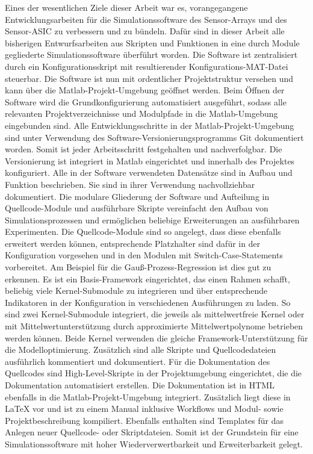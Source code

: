 Eines der wesentlichen Ziele dieser Arbeit war es, vorangegangene Entwicklungsarbeiten für die Simulationssoftware des Sensor-Arrays und des Sensor-ASIC zu verbessern und zu bündeln. Dafür sind in dieser Arbeit alle bisherigen Entwurfsarbeiten aus Skripten und Funktionen in eine durch Module gegliederte Simulationssoftware überführt worden. Die Software ist zentralisiert durch ein Konfigurationsskript mit resultierender Konfigurations-MAT-Datei steuerbar. Die Software ist nun mit ordentlicher Projektstruktur versehen und kann über die Matlab-Projekt-Umgebung geöffnet werden. Beim Öffnen der Software wird die Grundkonfigurierung automatisiert ausgeführt, sodass alle relevanten Projektverzeichnisse und Modulpfade in die Matlab-Umgebung eingebunden sind. Alle Entwicklungsschritte in der Matlab-Projekt-Umgebung sind unter Verwendung des Software-Versionierungsprogramms Git dokumentiert worden. Somit ist jeder Arbeitsschritt festgehalten und nachverfolgbar. Die Versionierung ist integriert in Matlab eingerichtet und innerhalb des Projektes konfiguriert. Alle in der Software verwendeten Datensätze sind in Aufbau und Funktion beschrieben. Sie sind in ihrer Verwendung nachvollziehbar dokumentiert. Die modulare Gliederung der Software und Aufteilung in Quellcode-Module und ausführbare Skripte vereinfacht den Aufbau von Simulationsprozessen und ermöglichen beliebige Erweiterungen an ausführbaren Experimenten. Die Quellcode-Module sind so angelegt, dass diese ebenfalls erweitert werden können, entsprechende Platzhalter sind dafür in der Konfiguration vorgesehen und in den Modulen mit Switch-Case-Statements vorbereitet. Am Beispiel für die Gauß-Prozess-Regression ist dies gut zu erkennen. Es ist ein Basis-Framework eingerichtet, das einen Rahmen schafft, beliebig viele Kernel-Submodule zu integrieren und über entsprechende Indikatoren in der Konfiguration in verschiedenen Ausführungen zu laden. So sind zwei Kernel-Submodule integriert, die jeweils als mittelwertfreie Kernel oder mit Mittelwertunterstützung durch approximierte Mittelwertpolynome betrieben werden können. Beide Kernel verwenden die gleiche Framework-Unterstützung für die Modelloptimierung. Zusätzlich sind alle Skripte und Quellcodedateien ausführlich kommentiert und dokumentiert. Für die Dokumentation des Quellcodes sind High-Level-Skripte in der Projektumgebung eingerichtet, die die Dokumentation automatisiert erstellen. Die Dokumentation ist in HTML ebenfalls in die Matlab-Projekt-Umgebung integriert. Zusätzlich liegt diese in LaTeX vor und ist zu einem Manual inklusive Workflows und Modul- sowie Projektbeschreibung kompiliert. Ebenfalls enthalten sind Templates für das Anlegen neuer Quellcode- oder Skriptdateien. Somit ist der Grundstein für eine Simulationssoftware mit hoher Wiederverwertbarkeit und Erweiterbarkeit gelegt.
